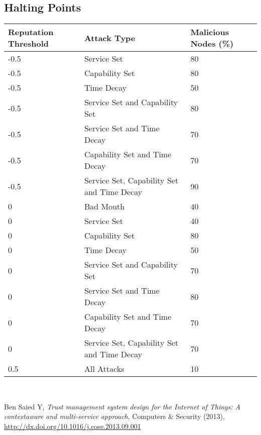 \documentclass{article}
\begin{document}
    \subsection*{Halting Points}
        \begin{tabularx}{\textwidth}{X X X}
            \toprule
            Reputation Threshold & Attack Type & Malicious Nodes (\%) \\
            \toprule
            -0.5 & Service Set & 80 \\
            \midrule
            -0.5 & Capability Set & 80 \\
            \midrule
            -0.5 & Time Decay & 50 \\
            \midrule
            -0.5 & Service Set and Capability Set & 80 \\
            \midrule
            -0.5 & Service Set and Time Decay & 70 \\
            \midrule
            -0.5 & Capability Set and Time Decay & 70 \\
            \midrule
            -0.5 & Service Set, Capability Set and Time Decay & 90 \\
            \midrule
            0 & Bad Mouth & 40 \\
            \midrule
            0 & Service Set & 40 \\
            \midrule
            0 & Capability Set & 80 \\
            \midrule
            0 & Time Decay & 50 \\
            \midrule
            0 & Service Set and Capability Set & 70 \\
            \midrule
            0 & Service Set and Time Decay & 80 \\
            \midrule
            0 & Capability Set and Time Decay & 70 \\
            \midrule
            0 & Service Set, Capability Set and Time Decay & 70 \\
            \midrule
            0.5 & All Attacks & 10 \\
            \bottomrule
        \end{tabularx} \\

    
    

    \begin{thebibliography}{9}
            Ben Saied Y,
            \textit{Trust management system design for the Internet of Things: A contextaware and multi-service approach},
            Computers \& Security (2013),
            \url{http://dx.doi.org/10.1016/j.cose.2013.09.001}
    \end{thebibliography}
\end{document}
